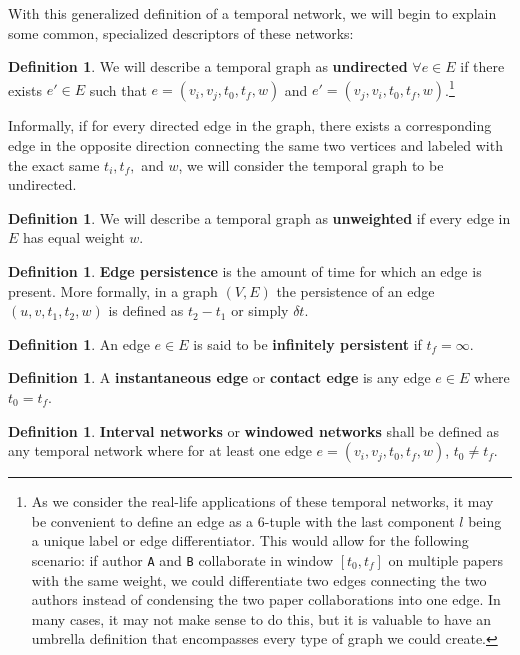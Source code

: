 \documentclass{article}
\theoremstyle{definition}
\newtheorem{defn}[thm]{Definition}
\numberwithin{thm}{subsection}
\begin{document}
With this generalized definition of a temporal network, we will begin to explain
some common, specialized descriptors of these networks:

\begin{defn}
  We will describe a temporal graph as \textbf{undirected} $\forall e \in E$
  if there exists $e' \in E$ such that $e = (v_i, v_j, t_0, t_f,w)$ and $e' =
  (v_j, v_i, t_0, t_f, w)$.\footnote{As we consider the real-life applications
  of these temporal networks, it may be convenient to define an edge as
  a 6-tuple with the last component $l$ being a unique label or edge
  differentiator. This would allow for the following scenario: if author
  \texttt{A} and \texttt{B} collaborate in window $[t_0, t_f]$ on multiple
  papers with the same weight, we could differentiate two edges connecting the
  two authors instead of condensing the two paper collaborations into one edge.
  In many cases, it may not make sense to do this, but it is valuable to have
  an umbrella definition that encompasses every type of graph we could create.}

  Informally, if for every directed edge in the graph, there exists a
  corresponding edge in the opposite direction connecting the same two
  vertices and labeled with the exact same $t_i, t_f,$ and $w$, we will consider
  the temporal graph to be undirected.
\end{defn}

\begin{defn}
  We will describe a temporal graph as \textbf{unweighted} if every edge in $E$
  has equal weight $w$.
\end{defn}

\begin{defn}
  \textbf{Edge persistence} is the amount of time for which an edge is present.
  More formally, in a graph $(V,E)$ the persistence of an edge $(u,v,t_1,t_2,
  w)$ is defined as $t_2 - t_1$ or simply $\delta t$.
\end{defn}

\begin{defn}
  An edge $e \in E$ is said to be \textbf{infinitely persistent}
  if $t_f = \infty$.
\end{defn}

\begin{defn}
  A \textbf{instantaneous edge} or \textbf{contact edge} is any edge $e \in E$
  where $t_0 = t_f$.
\end{defn}

\begin{defn}
  \textbf{Interval networks} or \textbf{windowed networks} shall be defined as
  any temporal network where for at least one edge $e = (v_i, v_j, t_0, t_f,w)$,
  $t_0 \neq t_f$.
\end{defn}
\end{document}
